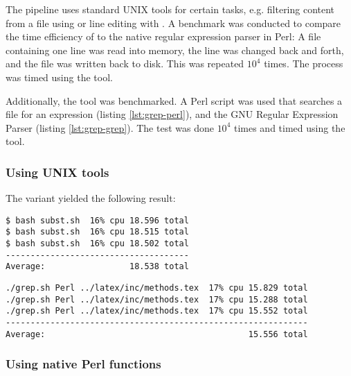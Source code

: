 The \hamstr pipeline uses standard UNIX tools for certain tasks, e.g. filtering
content from a file using  or line editing with . A
benchmark was conducted to compare the time efficiency of  to the
native regular expression parser in Perl: A file containing one line was read
into memory, the line was changed back and forth, and the file was written back
to disk. This was repeated $10^4$ times. The process was timed using the
 tool.

Additionally, the  tool was benchmarked. A Perl script was used that
searches a file for an expression (listing \ref{lst:grep-perl}), and the GNU
Regular Expression Parser  (listing \ref{lst:grep-grep}). The test
was done $10^4$ times and timed using the  tool.

\subsubsection{Using UNIX tools}



The  variant yielded the following result:

\begin{verbatim}
$ bash subst.sh  16% cpu 18.596 total
$ bash subst.sh  16% cpu 18.515 total
$ bash subst.sh  16% cpu 18.502 total
-------------------------------------
Average:                 18.538 total
\end{verbatim}



\begin{verbatim}
./grep.sh Perl ../latex/inc/methods.tex  17% cpu 15.829 total
./grep.sh Perl ../latex/inc/methods.tex  17% cpu 15.288 total
./grep.sh Perl ../latex/inc/methods.tex  17% cpu 15.552 total
-------------------------------------------------------------
Average:                                         15.556 total
\end{verbatim}

\subsubsection{Using native Perl functions}



